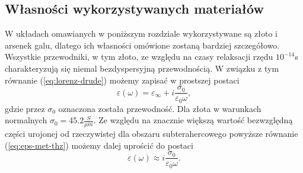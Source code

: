\subsection{Własności wykorzystywanych materiałów}
W układach omawianych w poniższym rozdziale wykorzystywane są złoto i arsenek galu, dlatego ich własności omówione zostaną bardziej szczegółowo. Wszystkie przewodniki, w tym złoto, ze względu na czasy relaksacji rzędu $10^{-14}$s charakteryzują się niemal bezdyspersyjną przewodnością. W związku z tym równanie (\ref{eq:lorenz-drude}) możemy zapisać w prostszej postaci
\begin{equation}
	\varepsilon(\omega)=\varepsilon_{\infty}+i \frac{\sigma_0}{\varepsilon_0 \omega},
	\label{eq:eps-met-thz}
\end{equation}
gdzie przez $\sigma_0$ oznaczona została przewodność. Dla złota w warunkach normalnych $\sigma_0=45.2 \frac{S}{\mu m}$.   Ze względu na znacznie większą wartość bezwzględną części urojonej od rzeczywistej dla obszaru subterahercowego powyższe równanie (\ref{eq:eps-met-thz}) możemy dalej uprościć do postaci
\begin{equation}
	\varepsilon(\omega) \approx i \frac{\sigma_0}{\varepsilon_0 \omega}.
	\label{eq:eps-met-thz-app}
\end{equation}

